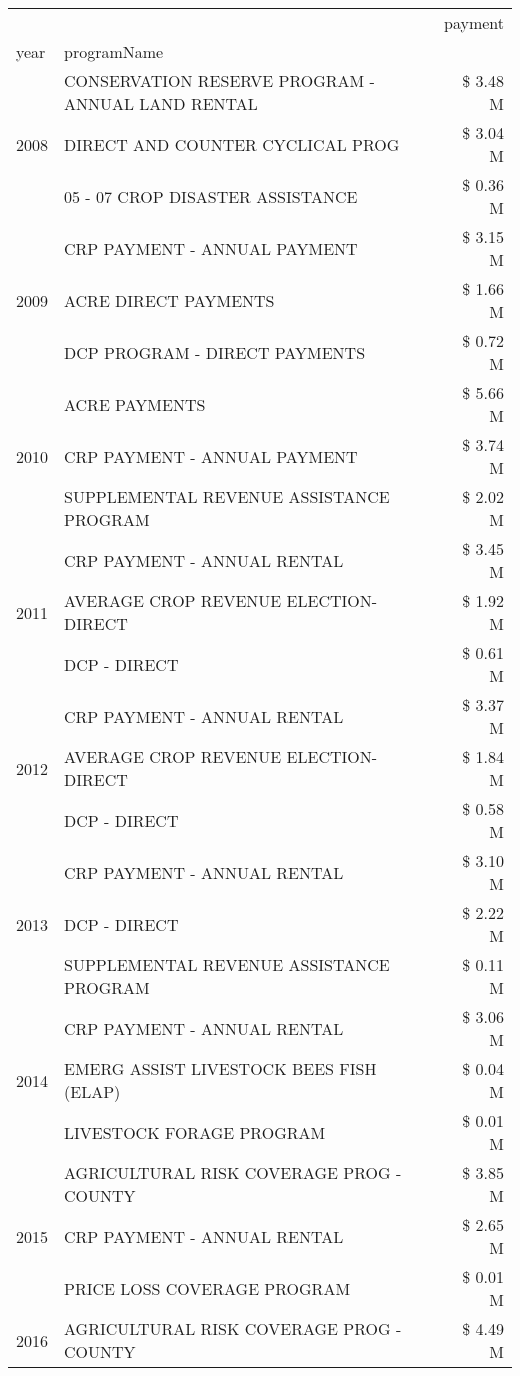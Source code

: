 \begin{tabular}{llr}
\toprule
 &  & payment \\
year & programName &  \\
\midrule
\multirow[t]{3}{*}{2008} & CONSERVATION RESERVE PROGRAM - ANNUAL LAND RENTAL & \$ 3.48 M \\
 & DIRECT AND COUNTER CYCLICAL PROG & \$ 3.04 M \\
 & 05 - 07 CROP DISASTER ASSISTANCE & \$ 0.36 M \\
\cline{1-3}
\multirow[t]{3}{*}{2009} & CRP PAYMENT - ANNUAL PAYMENT & \$ 3.15 M \\
 & ACRE DIRECT PAYMENTS & \$ 1.66 M \\
 & DCP PROGRAM - DIRECT PAYMENTS & \$ 0.72 M \\
\cline{1-3}
\multirow[t]{3}{*}{2010} & ACRE PAYMENTS & \$ 5.66 M \\
 & CRP PAYMENT - ANNUAL PAYMENT & \$ 3.74 M \\
 & SUPPLEMENTAL REVENUE ASSISTANCE PROGRAM & \$ 2.02 M \\
\cline{1-3}
\multirow[t]{3}{*}{2011} & CRP PAYMENT - ANNUAL RENTAL & \$ 3.45 M \\
 & AVERAGE CROP REVENUE ELECTION-DIRECT & \$ 1.92 M \\
 & DCP - DIRECT & \$ 0.61 M \\
\cline{1-3}
\multirow[t]{3}{*}{2012} & CRP PAYMENT - ANNUAL RENTAL & \$ 3.37 M \\
 & AVERAGE CROP REVENUE ELECTION-DIRECT & \$ 1.84 M \\
 & DCP - DIRECT & \$ 0.58 M \\
\cline{1-3}
\multirow[t]{3}{*}{2013} & CRP PAYMENT - ANNUAL RENTAL & \$ 3.10 M \\
 & DCP - DIRECT & \$ 2.22 M \\
 & SUPPLEMENTAL REVENUE ASSISTANCE PROGRAM & \$ 0.11 M \\
\cline{1-3}
\multirow[t]{3}{*}{2014} & CRP PAYMENT - ANNUAL RENTAL & \$ 3.06 M \\
 & EMERG ASSIST LIVESTOCK BEES FISH (ELAP) & \$ 0.04 M \\
 & LIVESTOCK FORAGE PROGRAM & \$ 0.01 M \\
\cline{1-3}
\multirow[t]{3}{*}{2015} & AGRICULTURAL RISK COVERAGE PROG - COUNTY & \$ 3.85 M \\
 & CRP PAYMENT - ANNUAL RENTAL & \$ 2.65 M \\
 & PRICE LOSS COVERAGE PROGRAM & \$ 0.01 M \\
\cline{1-3}
\multirow[t]{3}{*}{2016} & AGRICULTURAL RISK COVERAGE PROG - COUNTY & \$ 4.49 M \\

\end{tabular}

